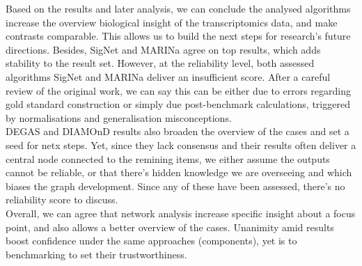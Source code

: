 Based on the results and later analysis, we can conclude the analysed algorithms increase the overview biological insight of the transcriptomics data, and make contrasts comparable. This allows us to build the next steps for research’s future directions. Besides, SigNet and MARINa agree on top results, which adds stability to the result set.
However, at the reliability level, both assessed algorithms SigNet and MARINa deliver an insufficient score. After a careful review of the original work, we can say this can be either due to errors regarding gold standard construction or simply due post-benchmark calculations, triggered by normalisations and generalisation misconceptions.
\\

DEGAS and DIAMOnD results also broaden the overview of the cases and set a seed for netx steps. Yet, since they lack consensus and their results often deliver a central node connected to the remining items, we either assume the outputs cannot be reliable, or that there’s hidden knowledge we are overseeing and which biases the graph development. Since any of these have been assessed, there’s no reliability score to discuss.
\\

Overall, we can agree that network analysis increase specific insight about a focus point, and also allows a better overview of the cases. Unanimity amid results boost confidence under the same approaches (components), yet is to benchmarking to set their trustworthiness.
